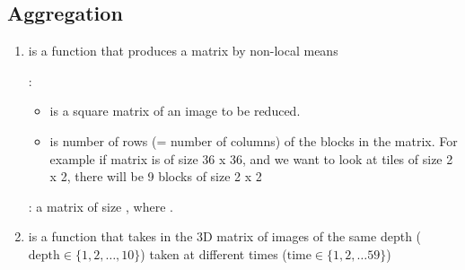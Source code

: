 \subsection{Aggregation}

\begin{enumerate}
\item {} is a function that produces a matrix by non-local means

\textbf{}:
\begin{itemize}
\item {} is a square matrix of an image to be reduced.
\item {} is number of rows (= number of columns) of the blocks in the matrix. For example if matrix is of size 36 x 36, and we want to look at tiles of 
size 2 x 2, there will be 9 blocks of size 2 x 2
\end{itemize}

\textbf{}: a matrix of size , where  .

\item {} is a function that takes in the 3D matrix of images of the same depth ($\text{depth} \in \{1, 2, \ldots, 10\}$)  taken at different times ($\text{time} \in \{1, 2, \ldots 59\}$)
\end{enumerate}

